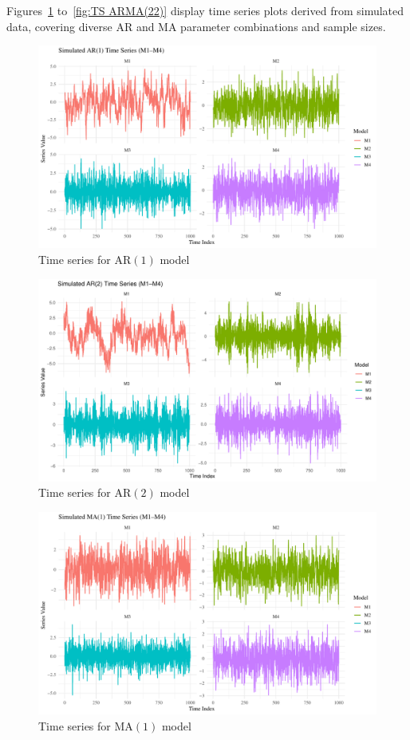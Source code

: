 \documentclass[12pt,a4paper]{article}
\begin{document}
Figures~\ref{fig:TS AR(1)} to~\ref{fig:TS ARMA(22)}  display time series plots derived from simulated data, covering diverse AR and MA parameter combinations and sample sizes.  %

\begin{figure}[H]
		\includegraphics[width=0.9 \textwidth]{ar1_time_series_plot}
		\caption{Time series for $\mathrm{AR}(1)$ model}
		\label{fig:TS AR(1)}
\end{figure}	

\begin{figure}[H]
	\includegraphics[width=0.9 \textwidth]{ar2_time_series_plot}
	\caption{Time series for $\mathrm{AR}(2)$ model}
	\label{fig:TS AR(2)}
\end{figure}	

\begin{figure}[H]
	\includegraphics[width=0.9 \textwidth]{ma1_time_series_plot}
	\caption{Time series for $\mathrm{MA}(1)$ model}
	\label{fig:TS MA(1)}
\end{figure}	
\end{document}
